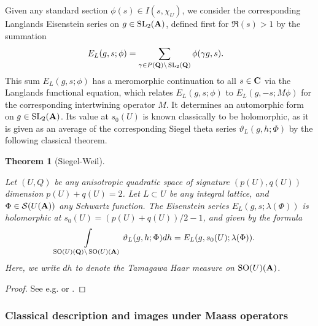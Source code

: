 \documentclass{amsart}
\newtheorem{theorem}{Theorem}[section]
\theoremstyle{definition}
\theoremstyle{definition}
\theoremstyle{definition}
\begin{document}
Given any standard section $\phi(s) \in I(s, \chi_U)$, we consider the corresponding Langlands Eisenstein 
series on $g \in \operatorname{SL}_2({\bf{A}})$, defined first for $\Re(s) >1$ by the summation
\begin{align*} E_L(g, s; \phi) &= \sum\limits_{\gamma \in P({\bf{Q}}) \backslash \operatorname{SL}_2({\bf{Q}})} \phi(\gamma g, s).\end{align*}
This sum $E_L(g, s; \phi)$ has a meromorphic continuation to all $s \in {\bf{C}}$ 
via the Langlands functional equation, which relates $E_L(g, s; \phi)$ to $E_L(g, -s; M \phi)$ for the corresponding intertwining operator $M$.
It determines an automorphic form on $g \in \operatorname{SL}_2({\bf{A}})$. 
Its value at $s_0(U)$ is known classically to be holomorphic, as it is given as an average of the corresponding 
Siegel theta series $\vartheta_L(g, h; \Phi)$ by the following classical theorem.

\begin{theorem}[Siegel-Weil]\label{SW}

Let $(U, Q)$ be any anisotropic quadratic space of signature $(p(U), q(U))$ dimension $p(U) + q(U) = 2$.
Let $L\subset U$ be any integral lattice, and $\Phi \in \mathcal{S}(U({\bf{A}}))$ any Schwartz function. 
The Eisenstein series $E_L(g, s; \lambda(\Phi))$ is holomorphic at $s_0(U) = (p(U)+q(U))/2-1$, and given by the formula 
\begin{align*} \int\limits_{ \operatorname{SO}(U)({\bf{Q}}) \backslash  \operatorname{SO}(U)({\bf{A}})} \vartheta_L(g,h; \Phi) dh 
&= E_L(g, s_0(U); \lambda(\Phi)).\end{align*}
Here, we write $dh$ to denote the Tamagawa Haar measure on $\operatorname{SO}(U)({\bf{A}})$. \end{theorem}

\begin{proof} See e.g. \cite[Theorem 4.1]{KuBF} or \cite[Theorem 2.1]{BY}. \end{proof}

\subsubsection{Classical description and images under Maass operators}
\end{document}
